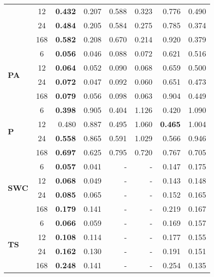 \begin{table}
\begin{tabular}{p{2.1cm}c|rr|rr|rr}
 & 12 & \bfseries 0.432 & 0.207 & 0.588 & 0.323 & 0.776 & 0.490 \\
 & 24 & \bfseries 0.484 & 0.205 & 0.584 & 0.275 & 0.785 & 0.374 \\
 & 168 & \bfseries 0.582 & 0.208 & 0.670 & 0.214 & 0.920 & 0.379 \\
\cline{1-8}
\multirow[c]{4}{*}{\parbox{2.1cm}{\textbf{PA}}} & 6 & \bfseries 0.056 & 0.046 & 0.088 & 0.072 & 0.621 & 0.516 \\
 & 12 & \bfseries 0.064 & 0.052 & 0.090 & 0.068 & 0.659 & 0.500 \\
 & 24 & \bfseries 0.072 & 0.047 & 0.092 & 0.060 & 0.651 & 0.473 \\
 & 168 & \bfseries 0.079 & 0.056 & 0.098 & 0.063 & 0.904 & 0.449 \\
\cline{1-8}
\multirow[c]{4}{*}{\parbox{2.1cm}{\textbf{P}}} & 6 & \bfseries 0.398 & 0.905 & 0.404 & 1.126 & 0.420 & 1.090 \\
 & 12 & 0.480 & 0.887 & 0.495 & 1.060 & \bfseries 0.465 & 1.004 \\
 & 24 & \bfseries 0.558 & 0.865 & 0.591 & 1.029 & 0.566 & 0.946 \\
 & 168 & \bfseries 0.697 & 0.625 & 0.795 & 0.720 & 0.767 & 0.705 \\
\cline{1-8}
\multirow[c]{4}{*}{\parbox{2.1cm}{\textbf{SWC}}} & 6 & \bfseries 0.057 & 0.041 & - & - & 0.147 & 0.175 \\
 & 12 & \bfseries 0.068 & 0.049 & - & - & 0.143 & 0.148 \\
 & 24 & \bfseries 0.085 & 0.065 & - & - & 0.152 & 0.165 \\
 & 168 & \bfseries 0.179 & 0.141 & - & - & 0.219 & 0.167 \\
\cline{1-8}
\multirow[c]{4}{*}{\parbox{2.1cm}{\textbf{TS}}} & 6 & \bfseries 0.066 & 0.059 & - & - & 0.169 & 0.157 \\
 & 12 & \bfseries 0.108 & 0.114 & - & - & 0.177 & 0.155 \\
 & 24 & \bfseries 0.162 & 0.130 & - & - & 0.191 & 0.151 \\
 & 168 & \bfseries 0.248 & 0.141 & - & - & 0.254 & 0.135 \\
\cline{1-8}
\bottomrule
\end{tabular}
\end{table}
